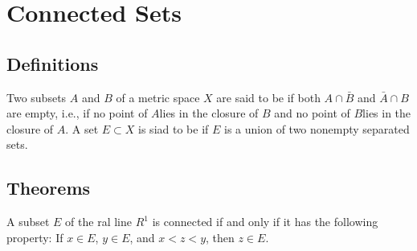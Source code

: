 \section{Connected Sets}
\subsection{Definitions}
\begin{definition}
	Two subsets $A$ and $B$ of a metric space $X$ are said to be {} if both $A \cap \bar B$ and $\bar A \cap B$ are empty, i.e., if no point of $A$lies in the closure of $B$ and no point of $B$lies in the closure of $A$. A set $E \subset X$ is siad to be {} if $E$ is {} a union of two nonempty separated sets. 
\end{definition}

\subsection{Theorems}
\begin{theorem}
	A subset $E$ of the ral line $R^1$ is connected if and only if it has the following property: If $x \in E$, $y \in E$, and $x < z < y$, then $z \in E$.
\end{theorem}